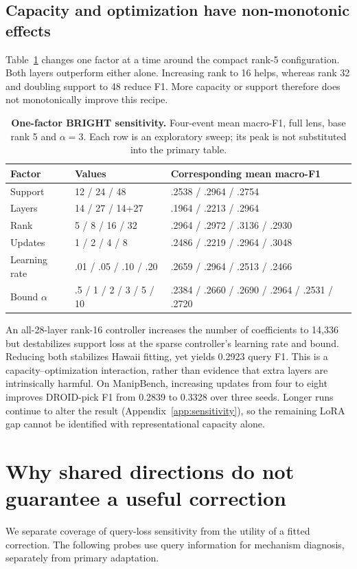 \documentclass{article}
\begin{document}
\subsection{Capacity and optimization have non-monotonic effects}
Table~\ref{tab:ablations} changes one factor at a time around the compact rank-5 configuration. Both layers outperform either alone. Increasing rank to 16 helps, whereas rank 32 and doubling support to 48 reduce F1. More capacity or support therefore does not monotonically improve this recipe.

\begin{table}[t]
\caption{\textbf{One-factor BRIGHT sensitivity.} Four-event mean macro-F1, full lens, base rank 5 and $\alpha=3$. Each row is an exploratory sweep; its peak is not substituted into the primary table.}
\label{tab:ablations}
\centering\small
\begin{tabular}{@{}lll@{}}
\toprule
Factor & Values & Corresponding mean macro-F1\\
\midrule
Support & 12 / 24 / 48 & .2538 / .2964 / .2754\\
Layers & 14 / 27 / 14+27 & .1964 / .2213 / .2964\\
Rank & 5 / 8 / 16 / 32 & .2964 / .2972 / .3136 / .2930\\
Updates & 1 / 2 / 4 / 8 & .2486 / .2219 / .2964 / .3048\\
Learning rate & .01 / .05 / .10 / .20 & .2659 / .2964 / .2513 / .2466\\
Bound $\alpha$ & .5 / 1 / 2 / 3 / 5 / 10 & .2384 / .2660 / .2690 / .2964 / .2531 / .2720\\
\bottomrule
\end{tabular}
\end{table}

An all-28-layer rank-16 controller increases the number of coefficients to 14,336 but destabilizes support loss at the sparse controller's learning rate and bound. Reducing both stabilizes Hawaii fitting, yet yields 0.2923 query F1. This is a capacity--optimization interaction, rather than evidence that extra layers are intrinsically harmful. On ManipBench, increasing updates from four to eight improves DROID-pick F1 from 0.2839 to 0.3328 over three seeds. Longer runs continue to alter the result (Appendix~\ref{app:sensitivity}), so the remaining LoRA gap cannot be identified with representational capacity alone.

\section{Why shared directions do not guarantee a useful correction}
\label{sec:mechanism}
We separate coverage of query-loss sensitivity from the utility of a fitted correction. The following probes use query information for mechanism diagnosis, separately from primary adaptation.
\end{document}
